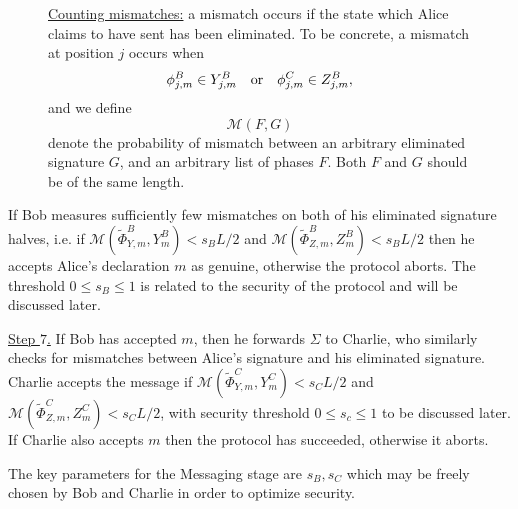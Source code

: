 \begin{figure}[htp]
\captionsetup{width=0.8\linewidth}
\begin{framed}
\noindent \underline{Counting mismatches:} a mismatch occurs if the state which Alice claims to have sent has been eliminated. To be concrete, a mismatch at position $j$ occurs when
\begin{equation}
\phi_{j, m}^B \in Y_{j, m}^B \qq{or} \phi_{j, m}^C \in Z_{j, m}^B, 
\end{equation}
and we define
\begin{equation}
\mathcal{M}\left(F, G\right)
\end{equation}
denote the probability of mismatch between an arbitrary eliminated signature $G$, and an arbitrary list of phases $F$. Both $F$ and $G$ should be of the same length.


\end{framed}
\end{figure}

If Bob measures sufficiently few mismatches on both of his eliminated signature halves, i.e. if $\mathcal{M}\left(\tilde{\Phi}_{Y, m}^B, Y_m^B\right) < s_B L/2$ and $\mathcal{M}\left(\tilde{\Phi}_{Z,m}^B, Z_m^B\right) < s_B L/2$ then he accepts Alice's declaration $m$ as genuine, otherwise the protocol aborts. The threshold $0 \le s_B \le 1$ is related to the security of the protocol and will be discussed later.

\noindent \underline{Step $7$.} If Bob has accepted $m$, then he forwards $\Sigma$ to Charlie, who similarly checks for mismatches between Alice's signature and his eliminated signature. Charlie accepts the message if $\mathcal{M}\left(\tilde{\Phi}_{Y, m}^C, Y_m^C\right) < s_C L/2$ and $\mathcal{M}\left(\tilde{\Phi}_{Z, m}^C, Z_m^C\right) < s_C L/2$, with security threshold $0 \le s_c \le 1$ to be discussed later. If Charlie also accepts $m$ then the protocol has succeeded, otherwise it aborts. 

The key parameters for the Messaging stage are $s_B, s_C$ which may be freely chosen by Bob and Charlie in order to optimize security.



